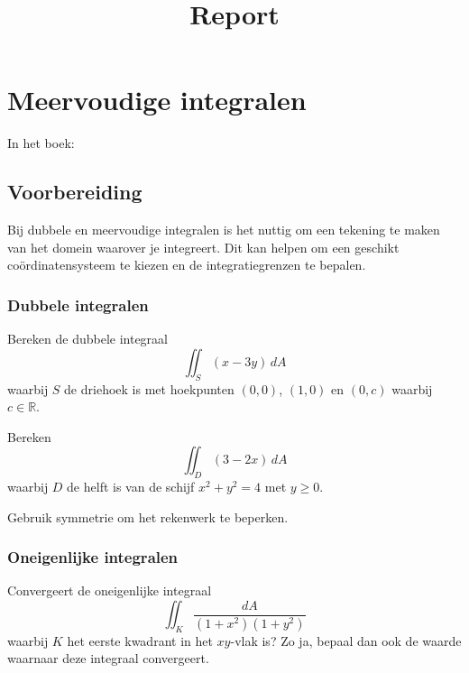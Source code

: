 \documentclass[
    10pt,
    a4paper,
    twoside,
]{report}
\title{Report}
\begin{document}
\maketitle
\tableofcontents

\chapter{Meervoudige integralen}


In het boek:~\cite[H15.1 - H15.6]{cursus}

\section*{Voorbereiding}

\begin{hint}{}
    Bij dubbele en meervoudige integralen is het nuttig om een tekening te maken van het domein waarover je integreert.
    Dit kan helpen om een geschikt coördinatensysteem te kiezen en de integratiegrenzen te bepalen.
\end{hint}


\subsection*{Dubbele integralen}

\begin{oefening}{}{}
    Bereken de dubbele integraal
    \[
        \iint_S (x-3y)\,dA
    \] waarbij $S$ de driehoek is met hoekpunten $(0,0)$, $(1,0)$ en $(0,c)$ waarbij $c \in \mathbb{R}$.
\end{oefening}

\begin{oefening}{}{}
    Bereken
    \[
        \iint_D (3-2x)\, dA
    \] waarbij $D$ de helft is van de schijf $x^2 + y^2 = 4$ met $y \geq 0$.
    \begin{hint}{}
        Gebruik symmetrie om het rekenwerk te beperken.
    \end{hint}
\end{oefening}


\subsection*{Oneigenlijke integralen}

\begin{oefening}{}{}
    Convergeert de oneigenlijke integraal
    \[
        \iint_K \frac{dA}{(1+x^2)(1+y^2)}
    \] waarbij $K$ het eerste kwadrant in het $xy$-vlak is?
    Zo ja, bepaal dan ook de waarde waarnaar deze integraal convergeert.
\end{oefening}
\end{document}
